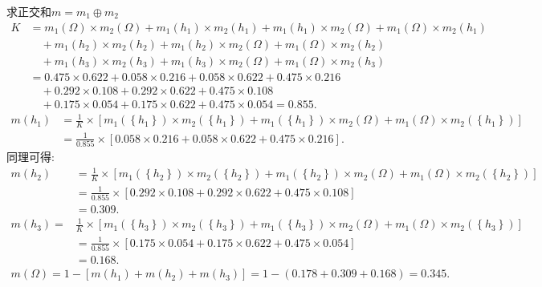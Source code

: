 求正交和$m=m_1\oplus m_2$
\begin{align*}
   K&=m_1(\Omega )\times m_2(\Omega )+m_1({h_1})\times m_2({h_1})+m_1({h_1})\times m_2(\Omega )+m_1(\Omega )\times m_2({h_1})\\
    &\quad +m_1({h_2})\times m_2({h_2})+m_1({h_2})\times m_2(\Omega )+m_1(\Omega )\times m_2({h_2})\\
    &\quad +m_1({h_3})\times m_2({h_3})+m_1({h_3})\times m_2(\Omega )+m_1(\Omega )\times m_2({h_3})\\
    &=0.475\times 0.622+0.058\times 0.216+0.058\times 0.622+0.475\times 0.216\\
    &\quad +0.292\times 0.108+0.292\times 0.622+0.475\times 0.108\\
    &\quad  +0.175\times 0.054+0.175\times 0.622+0.475\times 0.054 =0.855.
 \end{align*}
\begin{align*}
m\left(h_{1}\right) &=\frac{1}{K} \times\left[m_{1}\left(\left\{h_{1}\right\}\right) \times m_{2}\left(\left\{h_{1}\right\}\right)+m_{1}
       \left(\left\{h_{1}\right\}\right) \times m_{2}(\Omega)+m_{1}(\Omega) \times m_{2}\left(\left\{h_{1}\right\}\right)\right] \\
                    &=\frac{1}{0.855} \times[0.058 \times 0.216+0.058 \times 0.622+0.475 \times 0.216].
\end{align*}
同理可得:
\begin{align*}
m\left(h_{2}\right) &=\frac{1}{K} \times\left[m_{1}\left(\left\{h_{2}\right\}\right) \times m_{2}\left(\left\{h_{2}\right\}\right)+m_{1}\left(\left\{h_{2}\right\}\right) \times m_{2}(\Omega)+m_{1}(\Omega) \times m_{2}\left(\left\{h_{2}\right\}\right)\right] \\ &=\frac{1}{0.855} \times[0.292 \times 0.108+0.292 \times 0.622+0.475 \times 0.108] \\
                    &=0.309. \\
m\left(h_{3}\right)=& \frac{1}{K} \times\left[m_{1}\left(\left\{h_{3}\right\}\right) \times m_{2}\left(\left\{h_{3}\right\}\right)+m_{1}\left(\left\{h_{3}\right\}\right) \times m_{2}(\Omega)+m_{1}(\Omega) \times m_{2}\left(\left\{h_{3}\right\}\right)\right] \\ &=\frac{1}{0.855} \times[0.175 \times 0.054+0.175 \times 0.622+0.475 \times 0.054] \\
                    &=0.168.
\end{align*}
\begin{align*}
    m(\Omega )=1-[m({h_1})+m({h_2})+m{(h_3)}]=1-(0.178+0.309+0.168)=0.345.
\end{align*}

